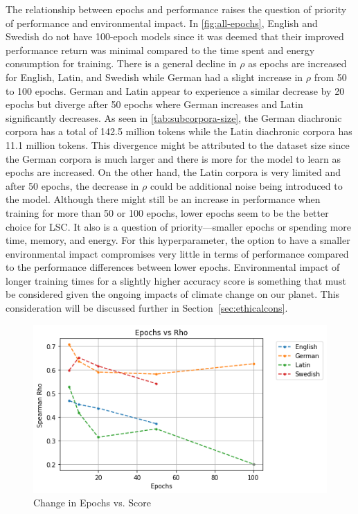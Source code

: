 The relationship between epochs and performance raises the question of priority of performance and environmental impact. In \autoref{fig:all-epochs}, English and Swedish do not have 100-epoch models since it was deemed that their improved performance return was minimal compared to the time spent and energy consumption for training. There is a general decline in $\rho$ as epochs are increased for English, Latin, and Swedish while German had a slight increase in $\rho$ from 50 to 100 epochs. German and Latin appear to experience a similar decrease by 20 epochs but diverge after 50 epochs where German increases and Latin significantly decreases. As seen in \autoref{tab:subcorpora-size}, the German diachronic corpora has a total of 142.5 million tokens while the Latin diachronic corpora has 11.1 million tokens. This divergence might be attributed to the dataset size since the German corpora is much larger and there is more for the model to learn as epochs are increased.  On the other hand, the Latin corpora is very limited and after 50 epochs, the decrease in $\rho$ could be additional noise being introduced to the model. Although there might still be an increase in performance when training for more than 50 or 100 epochs, lower epochs seem to be the better choice for LSC. It also is a question of priority—smaller epochs or spending more time, memory, and energy. For this hyperparameter, the option to have a smaller environmental impact compromises very little in terms of performance compared to the performance differences between lower epochs.  Environmental impact of longer training times for a slightly higher accuracy score is something that must be considered given the ongoing impacts of climate change on our planet. This consideration will be discussed further in Section~\ref{sec:ethicalcons}.

\begin{figure}[h]
  \centering
  \includegraphics[width=.8\linewidth]{sections/figures/epochs_all.png}
  \caption{Change in Epochs vs. Score}
  \label{fig:all-epochs}
\end{figure}

